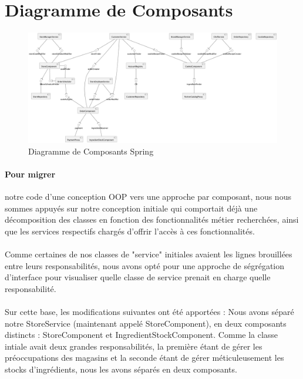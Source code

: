 
\section{Diagramme de Composants}

\begin{figure}[!ht]
\includegraphics[width=1\textwidth]{component-diagram}
\centering
\caption{Diagramme de Composants Spring}
\label{uml:component}
\end{figure}
\paragraph{Pour migrer} notre code d'une conception OOP vers une approche par composant, nous nous sommes appuyés sur notre 
conception initiale qui comportait déjà une décomposition des classes en fonction des fonctionnalités métier recherchées,
ainsi que les services respectifs chargés d'offrir l'accès à ces fonctionnalités.

\paragraph{}Comme certaines de nos classes de "service" initiales avaient les lignes brouillées entre leurs responsabilités, nous avons opté pour une approche de ségrégation d'interface pour visualiser quelle classe de service prenait en charge quelle responsabilité.

\paragraph{}Sur cette base, les modifications suivantes ont été apportées :
Nous avons séparé notre StoreService (maintenant appelé StoreComponent), en deux composants distincts : StoreComponent et IngredientStockComponent. Comme la classe intiale avait deux grandes responsabilités, la première étant de gérer les préoccupations des magasins et la seconde étant de gérer méticuleusement les stocks d'ingrédients, nous les avons séparés en deux composants. 

